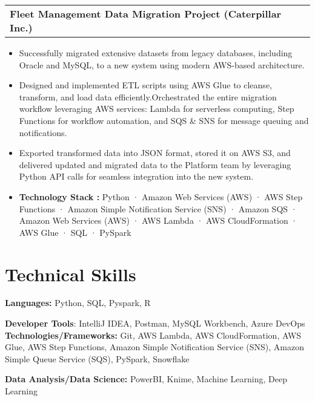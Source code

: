 \documentclass[letterpaper,11pt]{article}
\makeatletter
\newcommand{\resumeItem}[1]{
  \item\small{
    {#1 \vspace{-2pt}}
  }
}
\newcommand{\resumeProjectHeading}[2]{
    \vspace{-2pt}\item
    \begin{tabular*}{0.97\textwidth}{l@{\extracolsep{\fill}}r}
      \small#1 & #2 \\
    \end{tabular*}\vspace{-7pt}
}
\newcommand{\resumeSubHeadingListStart}{\begin{itemize}[leftmargin=0.15in, label={}]}
\newcommand{\resumeSubHeadingListEnd}{\end{itemize}}
\newcommand{\resumeItemListStart}{\begin{itemize}}
\newcommand{\resumeItemListEnd}{\end{itemize}\vspace{-5pt}}
\makeatother
\begin{document}
      \resumeProjectHeading
        {\textbf{Fleet Management Data Migration Project (Caterpillar Inc.)}}{}
          \resumeItemListStart
            \resumeItem{Successfully migrated extensive datasets from legacy databases, including Oracle and MySQL, to a new system using modern AWS-based architecture.}
            \resumeItem{Designed and implemented ETL scripts using AWS Glue to cleanse, transform, and load data efficiently.Orchestrated the entire migration workflow leveraging AWS services: Lambda for serverless computing, Step Functions for workflow automation, and SQS \& SNS for message queuing and notifications.}  
            \resumeItem{Exported transformed data into JSON format, stored it on AWS S3, and delivered updated and migrated data to the Platform team by leveraging Python API calls for seamless integration into the new system.}    
            \resumeItem{ \textbf{Technology Stack :} Python · Amazon Web Services (AWS) · AWS Step Functions · Amazon Simple Notification Service (SNS) · Amazon SQS · Amazon Web Services (AWS) · AWS Lambda · AWS CloudFormation · AWS Glue · SQL · PySpark}             
          \resumeItemListEnd
    

\section{Technical Skills}
  \vspace{2pt}
  \resumeSubHeadingListStart
    \small{\item{
        \textbf{Languages:}{ Python, SQL, Pyspark, R} \\ \vspace{3pt}

        \textbf{Developer Tools}{: IntelliJ IDEA, Postman, MySQL Workbench, Azure DevOps} \\ \vspace{3pt}      
        \textbf{Technologies/Frameworks:}{ Git,  AWS Lambda,  AWS CloudFormation, AWS Glue, AWS Step Functions, Amazon Simple Notification Service (SNS), Amazon Simple Queue Service (SQS), PySpark, Snowflake} \\ \vspace{3pt}

        \textbf{Data Analysis/Data Science:}{ PowerBI, Knime, Machine Learning, Deep Learning} \\ \vspace{3pt}                    
        
        
    }}
  \resumeSubHeadingListEnd
\end{document}
